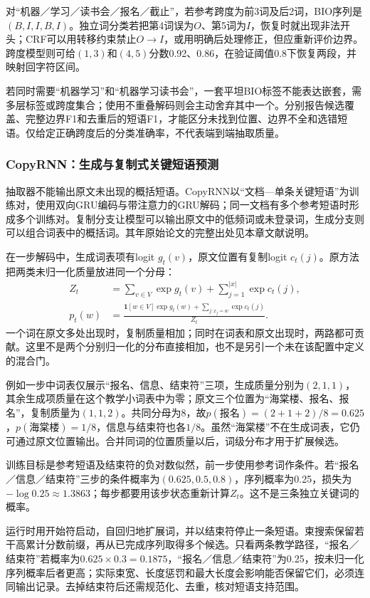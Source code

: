 对“机器／学习／读书会／报名／截止”，若参考跨度为前3词及后2词，BIO序列是$(B,I,I,B,I)$。独立词分类若把第4词误为$O$、第5词为$I$，恢复时就出现非法开头；CRF可以用转移约束禁止$O\to I$，或用明确后处理修正，但应重新评价边界。跨度模型则可给$(1,3)$和$(4,5)$分数0.92、0.86，在验证阈值0.8下恢复两段，并映射回字符区间。

若同时需要“机器学习”和“机器学习读书会”，一套平坦BIO标签不能表达嵌套，需多层标签或跨度集合；使用不重叠解码则会主动舍弃其中一个。分别报告候选覆盖、完整边界F1和去重后的短语F1，才能区分未找到位置、边界不全和选错短语。仅给定正确跨度后的分类准确率，不代表端到端抽取质量。

\subsubsection{CopyRNN：生成与复制式关键短语预测}
\label{sec:nlp-classification-copyrnn}

抽取器不能输出原文未出现的概括短语。CopyRNN以“文档—单条关键短语”为训练对，使用双向GRU编码与带注意力的GRU解码；同一文档有多个参考短语时形成多个训练对。复制分支让模型可以输出原文中的低频词或未登录词，生成分支则可以组合词表中的概括词。其\citeyear{nlp-meng2017copyrnn}年原始论文的完整出处见本章文献说明。

在一步解码中，生成词表项有logit $g_t(v)$，原文位置有复制logit $c_t(j)$。原方法把两类未归一化质量放进同一个分母：
\[
 \begin{aligned}
   Z_t&=\sum_{v\in V}\exp g_t(v)+\sum_{j=1}^{|x|}\exp c_t(j),\\
   p_t(w)&=\frac{
     \mathbf1[w\in V]\exp g_t(w)
     +\sum_{j:x_j=w}\exp c_t(j)}{Z_t}.
 \end{aligned}
\]
一个词在原文多处出现时，复制质量相加；同时在词表和原文出现时，两路都可贡献。这里不是两个分别归一化的分布直接相加，也不是另引一个未在该配置中定义的混合门。

例如一步中词表仅展示“报名、信息、结束符”三项，生成质量分别为$(2,1,1)$，其余生成项质量在这个教学小词表中为零；原文三个位置为“海棠楼、报名、报名”，复制质量为$(1,1,2)$。共同分母为8，故$p(\text{报名})=(2+1+2)/8=0.625$，$p(\text{海棠楼})=1/8$，信息与结束符也各$1/8$。虽然“海棠楼”不在生成词表，它仍可通过原文位置输出。合并同词的位置质量以后，词级分布才用于扩展候选。

训练目标是参考短语及结束符的负对数似然，前一步使用参考词作条件。若“报名／信息／结束符”三步的条件概率为$(0.625,0.5,0.8)$，序列概率为0.25，损失为$-\log0.25\approx1.3863$；每步都要用该步状态重新计算$Z_t$。这不是三条独立关键词的概率。

运行时用开始符启动，自回归地扩展词，并以结束符停止一条短语。束搜索保留若干高累计分数前缀，再从已完成序列取得多个候选。只看两条教学路径，“报名／结束符”若概率为$0.625\times0.3=0.1875$，“报名／信息／结束符”为0.25，按未归一化序列概率后者更高；实际束宽、长度惩罚和最大长度会影响能否保留它们，必须连同输出记录。去掉结束符后还需规范化、去重，核对短语支持范围。

